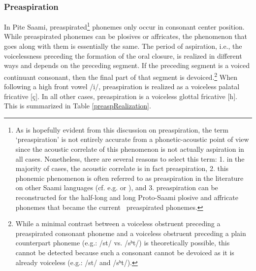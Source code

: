 \subsubsection{Preaspiration}\label{preaspiration}\noindent
In Pite Saami, preaspirated\footnote{As is hopefully evident from this discussion on preaspiration, the term ‘preaspiration’ is not entirely accurate from a phonetic-acoustic point of view since the acoustic correlate of this phenomenon is not actually aspiration in all cases. Nonetheless, there are several reasons to select this term: 1. in the majority of cases, the acoustic correlate is in fact preaspiration, 2. this phonemic phenomenon is often referred to as preaspiration in the literature on %
other Saami languages (cf. e.g. \citet[54-55]{Sammallahti1998} %
or \citet[57,67]{Feist2010}), and 3. preaspiration can be reconstructed for the half-long and long Proto-Saami plosive and affricate phonemes \citep[cf.][54]{Sammallahti1998} that became the current \PS\ preaspirated phonemes.} 
phonemes only occur in consonant center position. While preaspirated phonemes can be plosives or affricates, the phenomenon that goes along with them is essentially the same. %
The period of aspiration, i.e., the voicelessness preceding the formation of the oral closure, is realized in different ways and depends on the preceding segment. If the preceding segment is a voiced continuant %
consonant, then the final part of that segment is devoiced.\footnote{While a minimal contrast between a voiceless obstruent preceding a preaspirated consonant phoneme and a voiceless obstruent preceding a plain counterpart phoneme (e.g.: /st/ vs. /sʰt/) is theoretically possible, this cannot be detected because such a consonant cannot be devoiced as it is already voiceless (e.g.: /st/ \ARROW [st] and /sʰt/\ARROW [st]).} %
When following a high front vowel /i/, preaspiration is realized as a voiceless palatal fricative [ç]. 
In all other cases, preaspiration is a voiceless glottal fricative [h]. This is summarized in Table \vref{preaspRealization}. %
